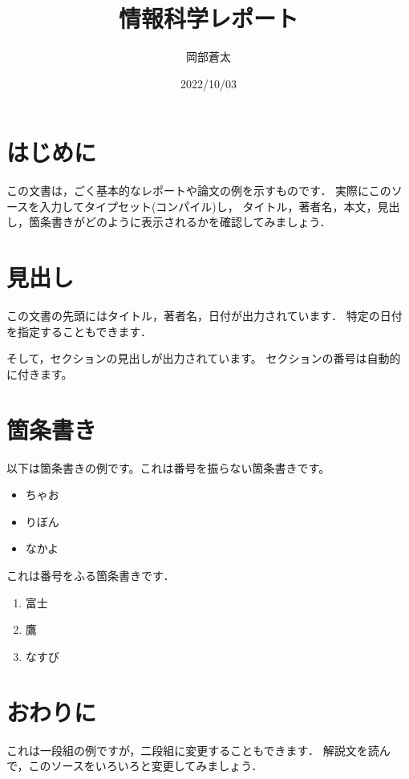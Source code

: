 \documentclass[a4paper, 11pt, uplatex]{jsarticle}
\begin{document}
\title{情報科学レポート}
\author{岡部蒼太}
\date{2022/10/03}
\maketitle


\section{はじめに}
この文書は，ごく基本的なレポートや論文の例を示すものです．
実際にこのソースを入力してタイプセット(コンパイル)し，
タイトル，著者名，本文，見出し，箇条書きがどのように表示されるかを確認してみましょう．

\section{見出し}
この文書の先頭にはタイトル，著者名，日付が出力されています．
特定の日付を指定することもできます．

そして，セクションの見出しが出力されています。
セクションの番号は自動的に付きます。

\section{箇条書き}
以下は箇条書きの例です。これは番号を振らない箇条書きです。
\begin{itemize}
	\item ちゃお
	\item りぼん
	\item なかよ
\end{itemize}

これは番号をふる箇条書きです．
\begin{enumerate}
	\item 富士
	\item 鷹
	\item なすび
\end{enumerate}

\section{おわりに}
これは一段組の例ですが，二段組に変更することもできます．
解説文を読んで，このソースをいろいろと変更してみましょう．
\end{document}
